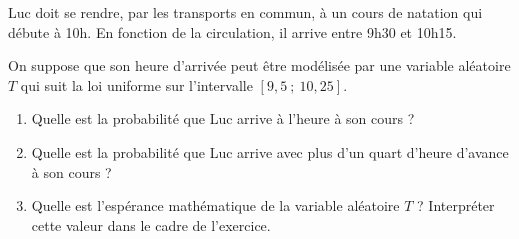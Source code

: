 \par
%
%
\par
Luc doit se rendre, par les transports en commun,  à un cours de natation qui débute à 10h. En fonction de la circulation, il arrive entre 9h30 et 10h15.
\par
On suppose que son heure d'arrivée peut être modélisée par une variable aléatoire $T$ qui suit la loi uniforme sur l'intervalle ${[9,5~;~10,25]}$.
\par
\begin{enumerate}
     \item Quelle est la probabilité que Luc arrive à l'heure à son cours ?
     \item Quelle est la probabilité que Luc arrive avec plus d'un quart d'heure d'avance à son cours ?
     \item Quelle est l'espérance mathématique de la variable aléatoire $T$ ?
     Interpréter cette valeur dans le cadre de l'exercice.
     \par
\end{enumerate}
